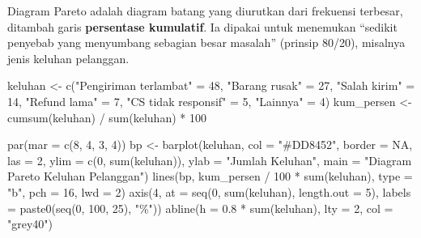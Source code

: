 \documentclass[
  indonesian,
  letterpaper,
]{book}
\newenvironment{Shaded}{\begin{snugshade}}{\end{snugshade}}
\newcommand{\AttributeTok}[1]{\textcolor[rgb]{0.40,0.45,0.13}{#1}}
\newcommand{\ConstantTok}[1]{\textcolor[rgb]{0.56,0.35,0.01}{#1}}
\newcommand{\DecValTok}[1]{\textcolor[rgb]{0.68,0.00,0.00}{#1}}
\newcommand{\FloatTok}[1]{\textcolor[rgb]{0.68,0.00,0.00}{#1}}
\newcommand{\FunctionTok}[1]{\textcolor[rgb]{0.28,0.35,0.67}{#1}}
\newcommand{\NormalTok}[1]{\textcolor[rgb]{0.00,0.23,0.31}{#1}}
\newcommand{\OtherTok}[1]{\textcolor[rgb]{0.00,0.23,0.31}{#1}}
\newcommand{\SpecialCharTok}[1]{\textcolor[rgb]{0.37,0.37,0.37}{#1}}
\newcommand{\StringTok}[1]{\textcolor[rgb]{0.13,0.47,0.30}{#1}}
\begin{document}
Diagram Pareto adalah diagram batang yang diurutkan dari frekuensi
terbesar, ditambah garis \textbf{persentase kumulatif}. Ia dipakai untuk
menemukan ``sedikit penyebab yang menyumbang sebagian besar masalah''
(prinsip 80/20), misalnya jenis keluhan pelanggan.

\begin{Shaded}
\begin{Highlighting}[]
\NormalTok{keluhan }\OtherTok{\textless{}{-}} \FunctionTok{c}\NormalTok{(}\StringTok{"Pengiriman terlambat"} \OtherTok{=} \DecValTok{48}\NormalTok{, }\StringTok{"Barang rusak"} \OtherTok{=} \DecValTok{27}\NormalTok{, }\StringTok{"Salah kirim"} \OtherTok{=} \DecValTok{14}\NormalTok{,}
\StringTok{"Refund lama"} \OtherTok{=} \DecValTok{7}\NormalTok{, }\StringTok{"CS tidak responsif"} \OtherTok{=} \DecValTok{5}\NormalTok{, }\StringTok{"Lainnya"} \OtherTok{=} \DecValTok{4}\NormalTok{)}
\NormalTok{kum\_persen }\OtherTok{\textless{}{-}} \FunctionTok{cumsum}\NormalTok{(keluhan) }\SpecialCharTok{/} \FunctionTok{sum}\NormalTok{(keluhan) }\SpecialCharTok{*} \DecValTok{100}

\FunctionTok{par}\NormalTok{(}\AttributeTok{mar =} \FunctionTok{c}\NormalTok{(}\DecValTok{8}\NormalTok{, }\DecValTok{4}\NormalTok{, }\DecValTok{3}\NormalTok{, }\DecValTok{4}\NormalTok{))}
\NormalTok{bp }\OtherTok{\textless{}{-}} \FunctionTok{barplot}\NormalTok{(keluhan, }\AttributeTok{col =} \StringTok{"\#DD8452"}\NormalTok{, }\AttributeTok{border =} \ConstantTok{NA}\NormalTok{, }\AttributeTok{las =} \DecValTok{2}\NormalTok{, }\AttributeTok{ylim =} \FunctionTok{c}\NormalTok{(}\DecValTok{0}\NormalTok{, }\FunctionTok{sum}\NormalTok{(keluhan)),}
\AttributeTok{ylab =} \StringTok{"Jumlah Keluhan"}\NormalTok{, }\AttributeTok{main =} \StringTok{"Diagram Pareto Keluhan Pelanggan"}\NormalTok{)}
\FunctionTok{lines}\NormalTok{(bp, kum\_persen }\SpecialCharTok{/} \DecValTok{100} \SpecialCharTok{*} \FunctionTok{sum}\NormalTok{(keluhan), }\AttributeTok{type =} \StringTok{"b"}\NormalTok{, }\AttributeTok{pch =} \DecValTok{16}\NormalTok{, }\AttributeTok{lwd =} \DecValTok{2}\NormalTok{)}
\FunctionTok{axis}\NormalTok{(}\DecValTok{4}\NormalTok{, }\AttributeTok{at =} \FunctionTok{seq}\NormalTok{(}\DecValTok{0}\NormalTok{, }\FunctionTok{sum}\NormalTok{(keluhan), }\AttributeTok{length.out =} \DecValTok{5}\NormalTok{), }\AttributeTok{labels =} \FunctionTok{paste0}\NormalTok{(}\FunctionTok{seq}\NormalTok{(}\DecValTok{0}\NormalTok{, }\DecValTok{100}\NormalTok{, }\DecValTok{25}\NormalTok{), }\StringTok{"\%"}\NormalTok{))}
\FunctionTok{abline}\NormalTok{(}\AttributeTok{h =} \FloatTok{0.8} \SpecialCharTok{*} \FunctionTok{sum}\NormalTok{(keluhan), }\AttributeTok{lty =} \DecValTok{2}\NormalTok{, }\AttributeTok{col =} \StringTok{"grey40"}\NormalTok{)}
\end{Highlighting}
\end{Shaded}
\end{document}
